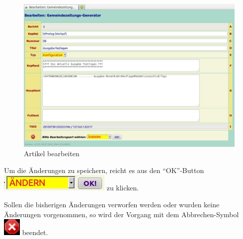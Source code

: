 \documentclass[12pt,a4paper,twoside]{article}%
\begin{document}
\begin{figure}[h]
\begin{center}                 
\includegraphics[width=0.9\linewidth]{webgui_bearbeiten.jpeg}
\end{center}                 
\caption{Artikel bearbeiten}
\end{figure} 

Um die Änderungen zu speichern, reicht es aus den "`OK"'-Button 
\includegraphics[height=2ex]{icons/aendern.jpeg} zu klicken. 

Sollen die bisherigen Änderungen verworfen werden oder wurden keine Änderungen 
vorgenommen, so wird der Vorgang mit dem Abbrechen-Symbol
\includegraphics[height=2ex]{icons/abort.jpeg}
beendet.
\end{document}
